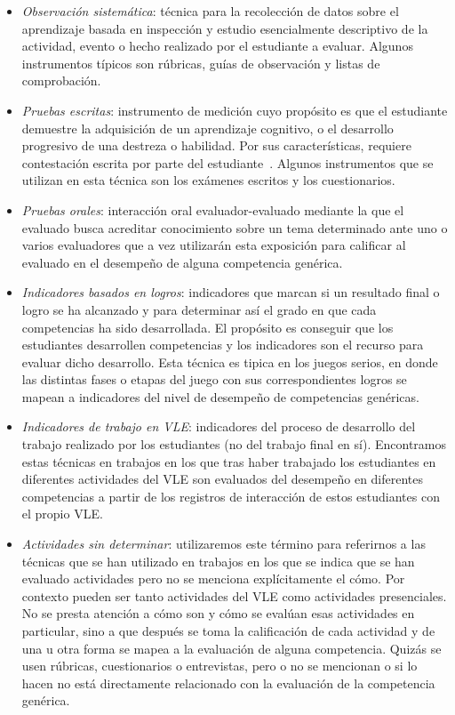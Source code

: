 \begin{itemize}
\item \emph{Observación sistemática}: técnica para la recolección de datos sobre el aprendizaje basada en inspección y estudio esencialmente descriptivo de la actividad, evento o hecho realizado por el estudiante a evaluar.  Algunos instrumentos típicos son rúbricas, guías de observación y listas de comprobación.
\item \emph{Pruebas escritas}: instrumento de medición cuyo propósito es que el estudiante demuestre la adquisición de un aprendizaje cognitivo, o el desarrollo progresivo de una destreza o habilidad. Por sus características, requiere contestación escrita por parte del estudiante~\cite{rojas2008prueba}. Algunos instrumentos que se utilizan en esta técnica son los exámenes escritos y los cuestionarios.
\item \emph{Pruebas orales}: interacción oral evaluador-evaluado mediante la que el evaluado busca acreditar conocimiento sobre un tema determinado ante uno o varios evaluadores que a vez utilizarán esta exposición para calificar al evaluado en el desempeño de alguna competencia genérica. 
\item \emph{Indicadores basados en logros}: indicadores que marcan si un resultado final o logro se ha alcanzado y para determinar así el grado en que cada competencias ha sido desarrollada. El propósito es conseguir que los estudiantes desarrollen competencias y los indicadores son el recurso para evaluar dicho desarrollo. Esta técnica es tipica en los juegos serios, en donde las distintas fases o etapas del juego con sus correspondientes logros se mapean a indicadores del nivel de desempeño de competencias genéricas.
\item \emph{Indicadores de trabajo en VLE}: indicadores del proceso de desarrollo del trabajo realizado por los estudiantes (no del trabajo final en sí). Encontramos estas técnicas en trabajos en los que tras haber trabajado los estudiantes en diferentes actividades del VLE son evaluados del desempeño en diferentes competencias a partir de los registros de interacción de estos estudiantes con el propio VLE. 
\item \emph{Actividades sin determinar}: utilizaremos este término para referirnos a las técnicas que se han utilizado en trabajos en los que se indica que se han evaluado actividades pero no se menciona explícitamente el cómo. Por contexto pueden ser tanto actividades del VLE como actividades presenciales. No se presta atención a cómo son y cómo se evalúan esas actividades en particular, sino a que después se toma la calificación de cada actividad y de una u otra forma se mapea a la evaluación de alguna competencia. Quizás se usen rúbricas, cuestionarios o entrevistas, pero o no se mencionan o si lo hacen no está directamente relacionado con la evaluación de la competencia genérica.
\end{itemize}

